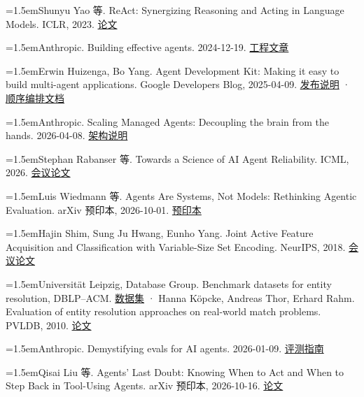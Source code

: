 \documentclass[UTF8,12pt,a4paper,fontset=none]{ctexart}
\begin{document}
{\small\hangindent=1.5em\noindent [2] Shunyu Yao 等. ReAct: Synergizing Reasoning and Acting in Language Models. ICLR, 2023. \href{https://arxiv.org/abs/2210.03629}{论文}\par}

{\small\hangindent=1.5em\noindent [3] Anthropic. Building effective agents. 2024-12-19. \href{https://www.anthropic.com/research/building-effective-agents}{工程文章}\par}

{\small\hangindent=1.5em\noindent [4] Erwin Huizenga, Bo Yang. Agent Development Kit: Making it easy to build multi-agent applications. Google Developers Blog, 2025-04-09. \href{https://developers.googleblog.com/agent-development-kit-easy-to-build-multi-agent-applications/}{发布说明} · \href{https://adk.dev/agents/workflow-agents/sequential-agents/}{顺序编排文档}\par}

{\small\hangindent=1.5em\noindent [5] Anthropic. Scaling Managed Agents: Decoupling the brain from the hands. 2026-04-08. \href{https://www.anthropic.com/research/managed-agents}{架构说明}\par}

{\small\hangindent=1.5em\noindent [6] Stephan Rabanser 等. Towards a Science of AI Agent Reliability. ICML, 2026. \href{https://proceedings.mlr.press/v306/rabanser26a.html}{会议论文}\par}

{\small\hangindent=1.5em\noindent [7] Luis Wiedmann 等. Agents Are Systems, Not Models: Rethinking Agentic Evaluation. arXiv 预印本, 2026-10-01. \href{https://arxiv.org/abs/2610.01618}{预印本}\par}

{\small\hangindent=1.5em\noindent [8] Hajin Shim, Sung Ju Hwang, Eunho Yang. Joint Active Feature Acquisition and Classification with Variable-Size Set Encoding. NeurIPS, 2018. \href{https://proceedings.neurips.cc/paper/2018/hash/e5841df2166dd424a57127423d276bbe-Abstract.html}{会议论文}\par}

{\small\hangindent=1.5em\noindent [9] Universität Leipzig, Database Group. Benchmark datasets for entity resolution, DBLP–ACM. \href{https://dbs.uni-leipzig.de/research/projects/benchmark-datasets-for-entity-resolution}{数据集} · Hanna Köpcke, Andreas Thor, Erhard Rahm. Evaluation of entity resolution approaches on real-world match problems. PVLDB, 2010. \href{https://www.vldb.org/pvldb/vol3/E04.pdf}{论文}\par}

{\small\hangindent=1.5em\noindent [10] Anthropic. Demystifying evals for AI agents. 2026-01-09. \href{https://www.anthropic.com/research/demystifying-evals-for-ai-agents}{评测指南}\par}

{\small\hangindent=1.5em\noindent [11] Qisai Liu 等. Agents’ Last Doubt: Knowing When to Act and When to Step Back in Tool-Using Agents. arXiv 预印本, 2026-10-16. \href{https://arxiv.org/abs/2610.24194}{论文}\par}
\end{document}
